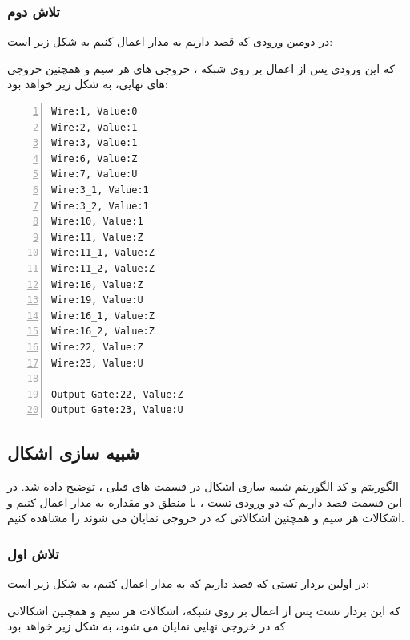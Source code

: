 \subsubsection{تلاش دوم}
در دومین ورودی که قصد داریم به مدار 
اعمال کنیم به شکل زیر است:


که این ورودی پس از اعمال بر روی شبکه ، خروجی های هر سیم و همچنین خروجی های نهایی، به شکل زیر خواهد بود:

\begin{latin}
\begin{lstlisting}[numbers=left, breaklines=true,tabsize=4]
Wire:1, Value:0 
Wire:2, Value:1 
Wire:3, Value:1 
Wire:6, Value:Z 
Wire:7, Value:U 
Wire:3_1, Value:1 
Wire:3_2, Value:1 
Wire:10, Value:1 
Wire:11, Value:Z 
Wire:11_1, Value:Z 
Wire:11_2, Value:Z 
Wire:16, Value:Z 
Wire:19, Value:U 
Wire:16_1, Value:Z 
Wire:16_2, Value:Z 
Wire:22, Value:Z 
Wire:23, Value:U 
------------------
Output Gate:22, Value:Z 
Output Gate:23, Value:U 
\end{lstlisting}
\end{latin}

\subsection{شبیه سازی اشکال 
}
الگوریتم و کد الگوریتم شبیه سازی اشکال 
در قسمت های قبلی ، توضیح داده شد. در این قسمت قصد داریم که دو ورودی تست ،‌ با منطق دو مقداره به مدار اعمال کنیم و اشکالات هر سیم و همچنین اشکالاتی که در خروجی نمایان می شوند را مشاهده کنیم.

\subsubsection{تلاش اول}
در اولین بردار تستی که قصد داریم که به مدار 
اعمال کنیم، به شکل زیر است: 


که این بردار تست پس از اعمال بر روی شبکه، اشکالات هر سیم و همچنین اشکالاتی که در خروجی نهایی نمایان می شود، به شکل زیر خواهد بود:

